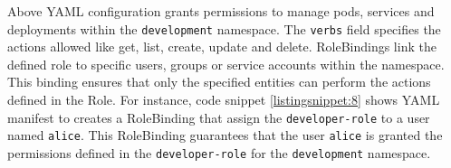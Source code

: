 
Above YAML configuration grants permissions to manage pods, services and deployments within the \texttt{development} namespace. The \texttt{verbs} field specifies the actions allowed like get, list, create, update and delete. RoleBindings link the defined role to specific users, groups or service accounts within the namespace. This binding ensures that only the specified entities can perform the actions defined in the Role. For instance, code snippet \autoref{listingsnippet:8} shows YAML manifest to creates a RoleBinding that assign the \texttt{developer-role} to a user named \texttt{alice}. This RoleBinding guarantees that the user \texttt{alice} is granted the permissions defined in the \texttt{developer-role} for the \texttt{development} namespace. \cite{Kubernetes_doc} 

